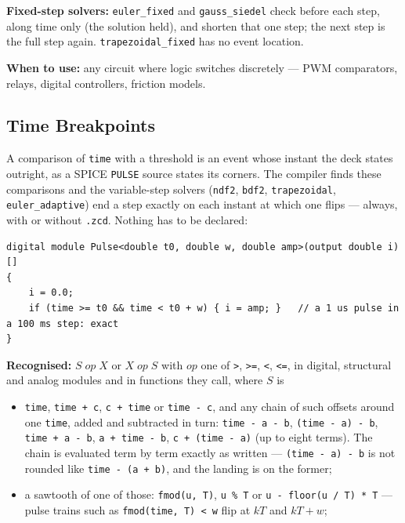 \documentclass[11pt, a4paper]{article}
\newcommand{\code}[1]{\texttt{\small #1}}
\begin{document}
\textbf{Fixed-step solvers:} \code{euler\_fixed} and \code{gauss\_siedel} check
before each step, along time only (the solution held), and shorten that one
step; the next step is the full step again. \code{trapezoidal\_fixed} has no
event location.

\textbf{When to use:} any circuit where logic switches discretely ---
PWM comparators, relays, digital controllers, friction models.

\subsection{Time Breakpoints}
\label{sec:breakpoints}

A comparison of \code{time} with a threshold is an event whose instant the
deck states outright, as a SPICE \code{PULSE} source states its corners. The
compiler finds these comparisons and the variable-step solvers (\code{ndf2},
\code{bdf2}, \code{trapezoidal}, \code{euler\_adaptive}) end a step exactly on
each instant at which one flips --- always, with or without \code{.zcd}.
Nothing has to be declared:

\begin{lstlisting}
digital module Pulse<double t0, double w, double amp>(output double i) []
{
    i = 0.0;
    if (time >= t0 && time < t0 + w) { i = amp; }   // a 1 us pulse in a 100 ms step: exact
}
\end{lstlisting}

\textbf{Recognised:} \(S\;\mathit{op}\;X\) or \(X\;\mathit{op}\;S\) with
\(\mathit{op}\) one of \code{>}, \code{>=}, \code{<}, \code{<=}, in digital,
structural and analog modules and in functions they call, where \(S\) is

\begin{itemize}
  \item \code{time}, \code{time + c}, \code{c + time} or \code{time - c}, and
        any chain of such offsets around one \code{time}, added and subtracted
        in turn: \code{time - a - b}, \code{(time - a) - b},
        \code{time + a - b}, \code{a + time - b}, \code{c + (time - a)}
        (up to eight terms). The chain is evaluated term by term exactly as
        written --- \code{(time - a) - b} is not rounded like
        \code{time - (a + b)}, and the landing is on the former;
  \item a sawtooth of one of those: \code{fmod(u, T)}, \code{u \% T} or
        \code{u - floor(u / T) * T} --- pulse trains such as
        \code{fmod(time, T) < w} flip at \(kT\) and \(kT + w\);
\end{itemize}
\end{document}
